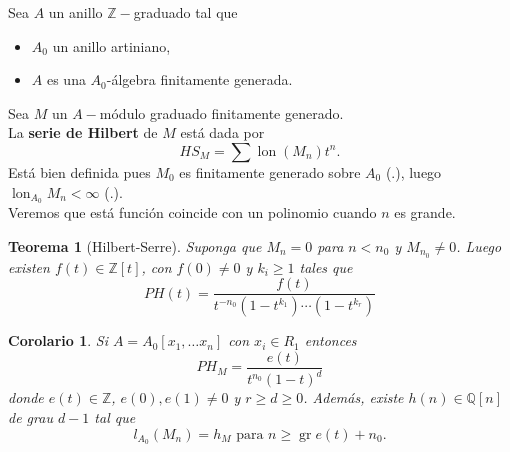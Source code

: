 \documentclass[12pt]{book}
\newtheorem{teo}{Teorema}
\newtheorem{cor}{Corolario}
\begin{document}
%
%
%
%
%
%

Sea $A$ un anillo $\mathbb{Z}-$graduado tal que 
\begin{itemize}
\item $A_0$ un anillo artiniano, 
\item $A$ es una $A_0$-álgebra finitamente generada.
\end{itemize}
Sea $M$ un $A-$módulo graduado finitamente generado. \\

 La \textbf{serie de Hilbert} de $M$ está dada por $$ HS _M = \sum \operatorname{lon} (M_n) t^n .$$
 Está bien definida pues $M_0$ es finitamente generado sobre $A_0$ (.), luego $\operatorname{lon}_{A_0} M_n < \infty $ (.).\\
 Veremos que está función coincide con un polinomio cuando $n$ es grande.


\begin{teo}[Hilbert-Serre]
Suponga que $M_n=0$ para $n<n_0$ y $M_{n_0}\neq 0$. Luego existen $f(t) \in \mathbb{Z}[t]$, con $f(0)\neq 0$ y $k_i \geq 1$ tales que $$ PH (t) = \frac{f(t)}{t^{-n_0}(1-t^{k_1}) \cdots (1-t^{k_r}) } $$
\end{teo}

\begin{cor}
Si $A=A_0[x_1 , \ldots x_n]$ con $x_i\in R_1$ entonces $$PH_M = \frac{e(t)}{t^{n_0} (1-t)^d} $$
donde $e(t)\in \mathbb{Z}$, $e(0),e(1) \neq 0$ y $r\geq d\geq 0$. Además, existe $h(n)\in \mathbb{Q}[n] $ de grau $d-1$ tal que $$l_{A_0}(M_n) = h_M  \mbox{ para } n\geq \operatorname{gr} e(t) + n_0. $$
\end{cor}
\end{document}
